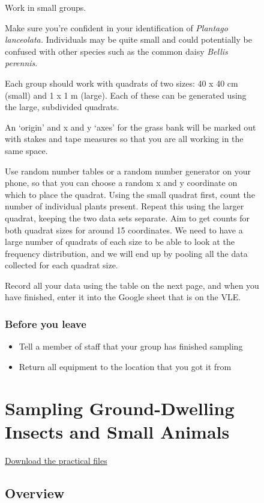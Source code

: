 \documentclass[
  letterpaper,
  DIV=11,
  numbers=noendperiod]{scrreprt}
\providecommand{\tightlist}{%
  \setlength{\itemsep}{0pt}\setlength{\parskip}{0pt}}
\begin{document}
\begin{figure}
{Work in small groups.

Make sure you're confident in your identification of \emph{Plantago
lanceolata.} Individuals may be quite small and could potentially be
confused with other species such as the common daisy \emph{Bellis
perennis}.

Each group should work with quadrats of two sizes: 40 x 40 cm (small)
and 1 x 1 m (large). Each of these can be generated using the large,
subdivided quadrats.

An `origin' and x and y `axes' for the grass bank will be marked out
with stakes and tape measures so that you are all working in the same
space.

Use random number tables or a random number generator on your phone, so
that you can choose a random x and y coordinate on which to place the
quadrat. Using the small quadrat first, count the number of individual
plants present. Repeat this using the larger quadrat, keeping the two
data sets separate. Aim to get counts for both quadrat sizes for around
15 coordinates. We need to have a large number of quadrats of each size
to be able to look at the frequency distribution, and we will end up by
pooling all the data collected for each quadrat size.

Record all your data using the table on the next page, and when you have
finished, enter it into the Google sheet that is on the VLE.

\subsection{Before you leave}\label{before-you-leave}

\begin{itemize}
\tightlist
\item
  Tell a member of staff that your group has finished sampling
\item
  Return all equipment to the location that you got it from
\end{itemize}

\chapter{Sampling Ground-Dwelling Insects and Small
Animals}\label{sec-pitfall-practical}

\href{files/BIO00036I\%20Animal\%20Sampling\%20Practical.docx}{Download
the practical files}

\section{Overview}\label{overview}

}
\end{figure}
\end{document}
